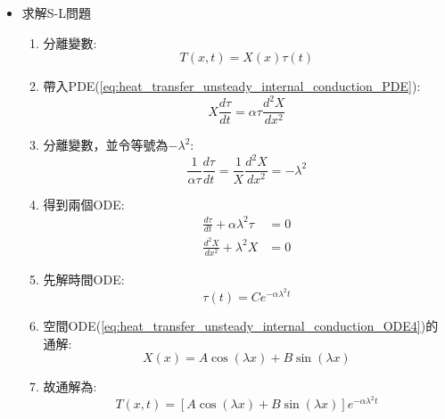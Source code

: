 \documentclass[../main.tex]{subfiles}
\begin{document}
\begin{itemize}
\begin{itemize}
\begin{align}
      -k \left.\frac{\partial T}{\partial x}\right|_{x=L} &= h \left[
        T(L,t) - T_{\infty}
      \right] \label{eq:heat_transfer_unsteady_internal_conduction_BC9}\\
      \left.\frac{\partial T}{\partial x}\right|_{x=0} &= 0 \label{eq:heat_transfer_unsteady_internal_conduction_BC10}
    \end{align}
    \item 求解S-L問題
    \begin{enumerate}
      \item 分離變數:
      \begin{equation}
        T(x,t) = X(x) \tau(t)
      \end{equation}
      \item 帶入PDE(\ref{eq:heat_transfer_unsteady_internal_conduction_PDE}):
      \begin{equation}
        X \frac{d\tau}{dt} = \alpha \tau \frac{d^2 X}{dx^2}
      \end{equation}
      \item 分離變數，並令等號為$-\lambda^2$:
      \begin{equation}
        \frac{1}{\alpha \tau} \frac{d\tau}{dt} = \frac{1}{X} \frac{d^2 X}{dx^2} = -\lambda^2
      \end{equation}
      \item 得到兩個ODE:
      \begin{align}
        \frac{d\tau}{dt} + \alpha \lambda^2 \tau &= 0 \label{eq:heat_transfer_unsteady_internal_conduction_ODE3}\\
        \frac{d^2 X}{dx^2} + \lambda^2 X &= 0 \label{eq:heat_transfer_unsteady_internal_conduction_ODE4}
      \end{align}
      \item 先解時間ODE:
      \begin{equation}
        \tau(t) = C e^{-\alpha \lambda^2 t}
      \end{equation}
      \item 空間ODE(\ref{eq:heat_transfer_unsteady_internal_conduction_ODE4})的通解:
      \begin{equation}  
        X(x) = A \cos (\lambda x) + B \sin (\lambda x)
      \end{equation}
      \item 故通解為:
      \begin{equation}
        T(x,t) = \left[
          A \cos (\lambda x )+ B \sin (\lambda x)
        \right] e^{-\alpha \lambda^2 t}
      \end{equation}

\end{enumerate}
\end{itemize}
\end{itemize}
\end{document}
